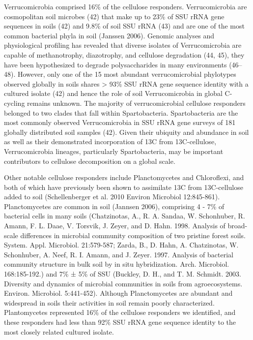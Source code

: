 Verrucomicrobia comprised 16\% of the cellulose responders. Verrucomicrobia are
cosmopolitan soil microbes (42) that make up to 23\% of SSU rRNA gene sequences
in soils (42) and 9.8\% of soil SSU rRNA (43) and are one of the most common
bacterial phyla in soil (Janssen 2006). Genomic analyses and physiological
profiling has revealed that diverse isolates of Verrucomicrobia are capable of
methanotrophy, diazotrophy, and cellulose degradation (44, 45), they have been
hypothesized to degrade polysaccharides in many environments (46–48). However,
only one of the 15 most abundant verrucomicrobial phylotypes observed globally
in soils shares > 93\% SSU rRNA gene sequence identity with a cultured isolate
(42) and hence the role of soil Verrucomicrobia in global C-cycling remains
unknown. The majority of verrucomicrobial cellulose responders belonged to two
clades that fall within Spartobacteria. Spartobacteria are the most commonly
observed Verrucomicrobia in SSU rRNA gene surveys of 181 globally distributed
soil samples (42). Given their ubiquity and abundance in soil as well as their
demonstrated incorporation of 13C from 13C-cellulose, Verrucomicrobia lineages,
particularly Spartobacteria, may be important contributors to cellulose
decomposition on a global scale. 

Other notable cellulose responders include Planctomycetes and Chloroflexi, and
both of which have previously been shown to assimilate 13C from 13C-cellulose
added to soil (Schellenberger et al. 2010 Environ Microbiol 12:845-861).
Planctomycetes are common in soil (Jannsen 2006), comprising 4 - 7\% of
bacterial cells in many soils (Chatzinotas, A., R. A. Sandaa, W. Schonhuber, R.
Amann, F. L. Daae, V. Torsvik, J. Zeyer, and D. Hahn. 1998. Analysis of
broad-scale differences in microbial community composition of two pristine
forest soils. System. Appl. Microbiol. 21:579-587; Zarda, B., D. Hahn, A.
Chatzinotas, W. Schonhuber, A. Neef, R. I. Amann, and J. Zeyer. 1997. Analysis
of bacterial community structure in bulk soil by in situ hybridization. Arch.
Microbiol. 168:185-192.) and 7\% ± 5\% of SSU (Buckley, D. H., and T. M.
Schmidt. 2003. Diversity and dynamics of microbial communities in soils from
agroecosystems. Environ. Microbiol. 5:441-452). Although Planctomycetes are
abundant and widespread in soils their activities in soil remain poorly
characterized. Plantomycetes represented 16\% of the cellulose responders we
identified, and these responders had less than 92\% SSU rRNA gene sequence
identity to the most closely related cultured isolate.

